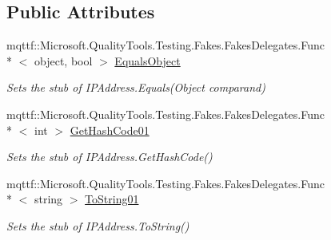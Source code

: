 \subsection*{Public Attributes}
\begin{DoxyCompactItemize}
\item 
mqttf\-::\-Microsoft.\-Quality\-Tools.\-Testing.\-Fakes.\-Fakes\-Delegates.\-Func\\*
$<$ object, bool $>$ \hyperlink{class_system_1_1_net_1_1_fakes_1_1_stub_i_p_address_a2b73b8b374819a830ff4077c52e465a4}{Equals\-Object}
\begin{DoxyCompactList}\small\item\em Sets the stub of I\-P\-Address.\-Equals(\-Object comparand)\end{DoxyCompactList}\item 
mqttf\-::\-Microsoft.\-Quality\-Tools.\-Testing.\-Fakes.\-Fakes\-Delegates.\-Func\\*
$<$ int $>$ \hyperlink{class_system_1_1_net_1_1_fakes_1_1_stub_i_p_address_aceba873e006477af4e2333d71b3bee35}{Get\-Hash\-Code01}
\begin{DoxyCompactList}\small\item\em Sets the stub of I\-P\-Address.\-Get\-Hash\-Code()\end{DoxyCompactList}\item 
mqttf\-::\-Microsoft.\-Quality\-Tools.\-Testing.\-Fakes.\-Fakes\-Delegates.\-Func\\*
$<$ string $>$ \hyperlink{class_system_1_1_net_1_1_fakes_1_1_stub_i_p_address_a9ff5b99790eaf4065370a69b7b9a3c21}{To\-String01}
\begin{DoxyCompactList}\small\item\em Sets the stub of I\-P\-Address.\-To\-String()\end{DoxyCompactList}\end{DoxyCompactItemize}
